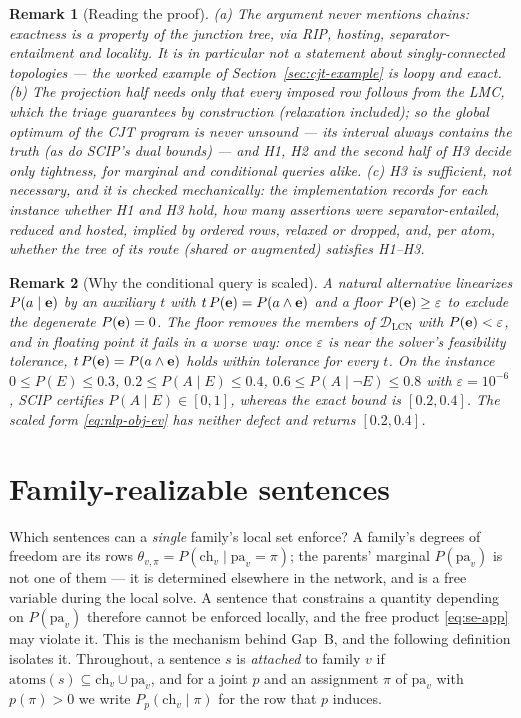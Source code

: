 \documentclass{article} %
\newtheorem{remark}{Remark}
\newcommand{\DLCN}{\mathcal{D}_{\mathrm{LCN}}}
\newcommand{\ch}{\mathrm{ch}}
\newcommand{\pa}{\mathrm{pa}}
\newcommand{\atoms}{\mathrm{atoms}}
\begin{document}
\begin{remark}[Reading the proof]\label{rem:d5reading}
(a) The argument never mentions chains: exactness is a property of the
\emph{junction tree}, via RIP, hosting, separator-entailment and locality. It is
in particular \emph{not} a statement about singly-connected topologies --- the
worked example of Section~\ref{sec:cjt-example} is loopy and exact.
(b) The projection half needs only that every imposed row follows from the LMC,
which the triage guarantees by construction (relaxation included); so the global
optimum of the \textsc{CJT} program is never unsound --- its interval always
contains the truth (as do SCIP's dual bounds) --- and H1, H2 and the second half of
H3 decide only tightness, for marginal and conditional queries alike. (c) H3 is
\emph{sufficient, not necessary}, and it is checked mechanically: the
implementation records for each instance whether H1 and H3 hold, how many
assertions were separator-entailed, reduced and hosted, implied by ordered rows,
relaxed or dropped, and, per atom, whether the tree of its route (shared or
augmented) satisfies H1--H3.
\end{remark}


\begin{remark}[Why the conditional query is scaled]\label{rem:denfloor}
A natural alternative linearizes $P(a\mid \mathbf{e})$ by an auxiliary $t$ with
$t\,P(\mathbf{e})=P(a\wedge \mathbf{e})$ and a floor $P(\mathbf{e})\ge\varepsilon$ to exclude the
degenerate $P(\mathbf{e})=0$. The floor removes the members of $\DLCN$ with
$P(\mathbf{e})<\varepsilon$, and in floating point it fails in a worse way: once
$\varepsilon$ is near the solver's feasibility tolerance, $t\,P(\mathbf{e})=P(a\wedge \mathbf{e})$
holds within tolerance for every $t$. On the instance
$0\le P(E)\le0.3$, $0.2\le P(A\mid E)\le0.4$, $0.6\le P(A\mid\lnot E)\le0.8$
with $\varepsilon=10^{-6}$, SCIP certifies $P(A\mid E)\in[0,1]$, whereas the exact
bound is $[0.2,0.4]$. The scaled form \eqref{eq:nlp-obj-ev} has neither defect and
returns $[0.2,0.4]$.
\end{remark}



\section{Family-realizable sentences}
\label{sec:realizable-app}

Which sentences can a \emph{single} family's local set enforce? A family's degrees of freedom are its
rows $\theta_{v,\pi}=P(\ch_v\mid\pa_v{=}\pi)$; the parents' marginal $P(\pa_v)$ is not one of them
--- it is determined elsewhere in the network, and is a free variable during the local solve. A
sentence that constrains a quantity depending on $P(\pa_v)$ therefore cannot be enforced locally,
and the free product \eqref{eq:se-app} may violate it. This is the mechanism behind Gap~B, and the
following definition isolates it. Throughout, a sentence $s$ is \emph{attached} to family $v$ if
$\atoms(s)\subseteq\ch_v\cup\pa_v$, and for a joint $p$ and an assignment $\pi$ of $\pa_v$ with
$p(\pi)>0$ we write $P_p(\ch_v\mid\pi)$ for the row that $p$ induces.
\end{document}
